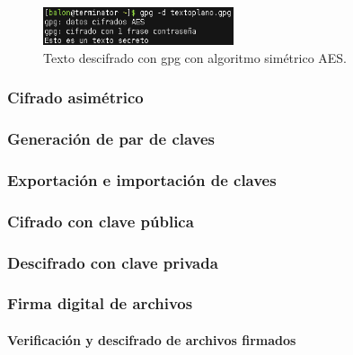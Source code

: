 \documentclass[a4paper, 11pt, titlepage]{book}
\begin{document}
                \begin{figure}[htp]
                    \centering
                    \includegraphics[width=0.5\textwidth]{resources/decrypt01.png}
                    \caption{Texto descifrado con gpg con algoritmo simétrico AES.}
                    \label{decrypt01}
                \end{figure}
    
            \subsubsection{Cifrado asimétrico}
                
    
                \subsubsection{Generación de par de claves}
    
                \subsubsection{Exportación e importación de claves}
    
                \subsubsection{Cifrado con clave pública}
    
                \subsubsection{Descifrado con clave privada}
    
            \subsubsection{Firma digital de archivos}
    
                \paragraph{Verificación y descifrado de archivos firmados}
    
\end{document}
